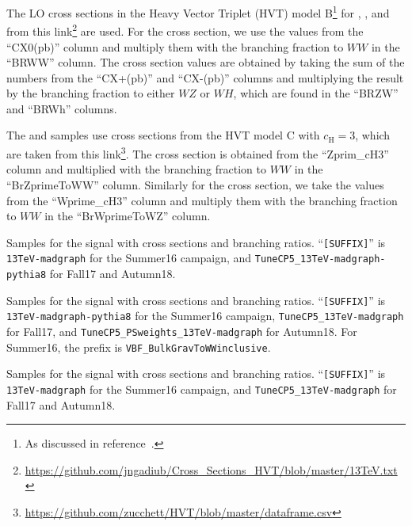 The LO cross sections in the Heavy Vector Triplet (HVT) model B\footnote{As discussed in reference~\cite{Pappadopulo_2014}.} for \DY\ZprtoWW, \DY\WprtoWZ, and \DY\WprtoWH from this link\footnote{\url{https://github.com/jngadiub/Cross\_Sections\_HVT/blob/master/13TeV.txt}} are used. %
For the \Zpr cross section, we use the values from the ``CX0(pb)'' column and multiply them with the branching fraction to $WW$ in the ``BRWW'' column.
The \Wpr cross section values are obtained by taking the sum of the numbers from the ``CX+(pb)'' and ``CX-(pb)'' columns and multiplying the result by the branching fraction to either $WZ$ or $WH$, which are found in the ``BRZW'' and ``BRWh'' columns.

The \VBF\ZprtoWW and \DY\WprtoWZ samples use cross sections from the HVT model C with $c_\mathrm{H}=3$, which are taken from this link\footnote{\url{https://github.com/zucchett/HVT/blob/master/dataframe.csv}}.
The \Zpr cross section is obtained from the ``Zprim\_cH3'' column and multiplied with the branching fraction to $WW$ in the ``BrZprimeToWW'' column.
Similarly for the \Wpr cross section, we take the values from the ``Wprime\_cH3'' column and multiply them with the branching fraction to $WW$ in the ``BrWprimeToWZ'' column.

\begin{table}[htbp]
  \centering
  
  \caption{
    Samples for the \ggF\GBulktoWW signal with cross sections and branching ratios.
    ``\texttt{[SUFFIX]}'' is \texttt{13TeV-madgraph} for the Summer16 campaign, and \texttt{TuneCP5\_13TeV-madgraph-pythia8} for Fall17 and Autumn18.
  }
  \label{tab:ggFGBulkToWWSamples}
\end{table}

\begin{table}[htbp]
  \centering
  
  \caption{
    Samples for the \VBF\GBulktoWW signal with cross sections and branching ratios.
    ``\texttt{[SUFFIX]}'' is \texttt{13TeV-madgraph-pythia8} for the Summer16 campaign, \texttt{TuneCP5\_13TeV-madgraph} for Fall17, and \texttt{TuneCP5\_PSweights\_13TeV-madgraph} for Autumn18.
    For Summer16, the prefix is \texttt{VBF\_BulkGravToWWinclusive}.
  }
  \label{tab:VBFGBulkToWWSamples}
\end{table}

\begin{table}[htbp]
  \centering
  
  \caption{
    Samples for the \ggF\RadtoWW signal with cross sections and branching ratios.
    ``\texttt{[SUFFIX]}'' is \texttt{13TeV-madgraph} for the Summer16 campaign, and \texttt{TuneCP5\_13TeV-madgraph} for Fall17 and Autumn18.
  }
  \label{tab:ggFRadToWWSamples}
\end{table}

